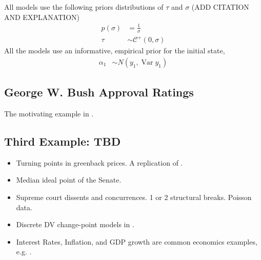 \documentclass{article}
\newcommand{\dist}[1]{\mathcal{#1}}
\newcommand{\paren}[1]{\ensuremath{\left(#1\right)}}
\newcommand{\dhalfcauchy}[1]{\ensuremath{\dist{C}^{+}\paren{#1}}}
\DeclareMathOperator{\E}{E}
\DeclareMathOperator{\Var}{Var}
\begin{document}
All models use the following priors distributions of $\tau$ and $\sigma$ (ADD CITATION AND EXPLANATION)
\begin{align}
  \label{eq:24}
  p(\sigma) &= \frac{1}{\sigma} \\
  \label{eq:25}
  \tau &\sim \dhalfcauchy{0, \sigma}
\end{align}
All the models use an informative, empirical prior for the initial state,
\begin{align}
  \label{eq:13}
  \alpha_{1} &\sim N(y_{1}, \Var y_{1})
\end{align}



%   

\subsection{George W. Bush Approval Ratings}
\label{sec:george-w.-bush}

The motivating example in \textcite{RatkovicEng2010}.

\subsection{Third Example: TBD}

\begin{itemize}
\item Turning points in greenback prices. A replication of \textcite{WillardGuinnaneEtAl1996}.
\item Median ideal point of the Senate. \parencites{RatkovicEng2010}
\item Supreme court dissents and concurrences. 1 or 2 structural breaks. Poisson data. \parencite{CalderiaZorn1998}
\item Discrete DV change-point models in \parencite{Spirling2007b}.
\item Interest Rates, Inflation, and GDP growth are common economics examples, e.g. \textcite{GiordaniKohn2008}.
\end{itemize}
\end{document}
